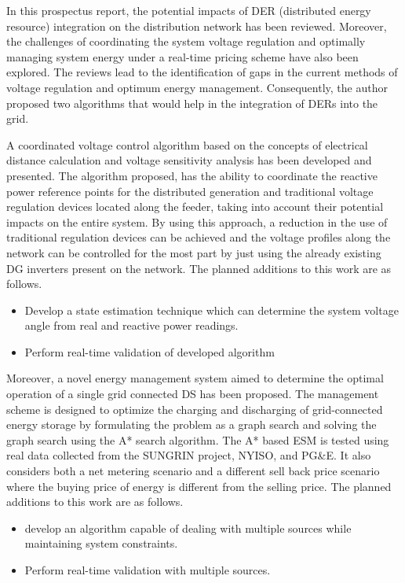 In this prospectus report, the potential impacts of DER (distributed energy resource) integration on the distribution network has been reviewed. Moreover, the challenges of coordinating the system voltage regulation and optimally managing system energy under a real-time pricing scheme have also been explored. The reviews lead to the identification of gaps in the current methods of voltage regulation and optimum energy management. Consequently, the author proposed two algorithms that would help in the integration of DERs into the grid.

A coordinated voltage control algorithm based on the concepts of electrical distance calculation and voltage sensitivity analysis has been developed and presented. The algorithm proposed, has the ability to coordinate the reactive power reference points for the distributed generation and traditional voltage regulation devices located along the feeder, taking into account their potential impacts on the entire system. By using this approach, a reduction in the use of traditional regulation devices can be achieved and the voltage profiles along the network can be controlled for the most part by just using the already existing DG inverters present on the network. The planned additions to this work are as follows.

\begin{itemize}
    \item Develop a state estimation technique which can determine the system voltage angle from real and reactive power readings.
    \item Perform real-time validation of developed algorithm
\end{itemize}

Moreover, a novel energy management system aimed to determine the optimal operation of a single grid connected DS has been proposed. The management scheme is designed to optimize the charging and discharging of grid-connected energy storage by formulating the problem as a graph search and solving the graph search using the A* search algorithm. The A* based ESM is tested using real data collected from the SUNGRIN project, NYISO, and PG\&E. It also considers both a net metering scenario and a different sell back price scenario where the buying price of energy is different from the selling price.  The planned additions to this work are as follows.

\begin{itemize}
    \item develop an algorithm capable of dealing with multiple sources while maintaining system constraints.
    \item Perform real-time validation with multiple sources.
\end{itemize}

